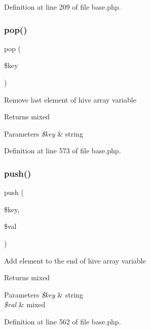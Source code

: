 Definition at line 209 of file base.\+php.

\hypertarget{class_base_a0a5ec8de186492bebff151ad40b17fa4}{}\label{class_base_a0a5ec8de186492bebff151ad40b17fa4} 
\subsubsection{\texorpdfstring{pop()}{pop()}}
{\footnotesize\ttfamily pop (\begin{DoxyParamCaption}\item[{}]{\$key }\end{DoxyParamCaption})}

Remove last element of hive array variable \begin{DoxyReturn}{Returns}
mixed 
\end{DoxyReturn}

\begin{DoxyParams}{Parameters}
{\em \$key} & string \\
\hline
\end{DoxyParams}


Definition at line 573 of file base.\+php.

\hypertarget{class_base_aef81a11cc1b68233d80e63bcf6fa94f3}{}\label{class_base_aef81a11cc1b68233d80e63bcf6fa94f3} 
\subsubsection{\texorpdfstring{push()}{push()}}
{\footnotesize\ttfamily push (\begin{DoxyParamCaption}\item[{}]{\$key,  }\item[{}]{\$val }\end{DoxyParamCaption})}

Add element to the end of hive array variable \begin{DoxyReturn}{Returns}
mixed 
\end{DoxyReturn}

\begin{DoxyParams}{Parameters}
{\em \$key} & string \\
\hline
{\em \$val} & mixed \\
\hline
\end{DoxyParams}


Definition at line 562 of file base.\+php.

\hypertarget{class_base_a7dbce4917d643c341f1c072f484329c1}{}\label{class_base_a7dbce4917d643c341f1c072f484329c1} 
